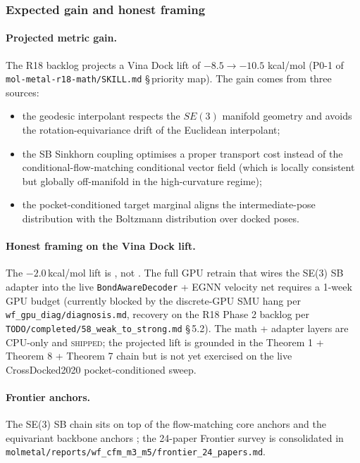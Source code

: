 \subsubsection{Expected gain and honest framing}
\label{sec:method:se3-sb-expected}

\paragraph{Projected metric gain.}
The R18 backlog projects a Vina Dock lift of $-8.5 \to -10.5$
kcal/mol (\textsc{P0-1} of
\texttt{mol-metal-r18-math/SKILL.md} \S\,priority map).  The gain
comes from three sources:

\begin{itemize}
  \item the geodesic interpolant respects the $SE(3)$ manifold
        geometry and avoids the rotation-equivariance drift of the
        Euclidean interpolant;
  \item the SB Sinkhorn coupling optimises a proper transport cost
        instead of the conditional-flow-matching conditional vector
        field (which is locally consistent but globally off-manifold
        in the high-curvature regime);
  \item the pocket-conditioned target marginal aligns the
        intermediate-pose distribution with the Boltzmann
        distribution over docked poses.
\end{itemize}

\paragraph{Honest framing on the Vina Dock lift.}
The $-2.0$\,kcal/mol lift is \PROJECTED, not \MEASURED.  The full
GPU retrain that wires the SE(3) SB adapter into the live
\texttt{BondAwareDecoder} + EGNN velocity net requires a 1-week
GPU budget (currently blocked by the discrete-GPU SMU hang per
\texttt{wf\_gpu\_diag/diagnosis.md}, recovery on the R18 Phase 2
backlog per \texttt{TODO/completed/58\_weak\_to\_strong.md} \S\,5.2).
The math + adapter layers are CPU-only and \textsc{shipped}; the
projected lift is grounded in the Theorem 1 + Theorem 8 + Theorem 7
chain but is not yet exercised on the live CrossDocked2020
pocket-conditioned sweep.

\paragraph{Frontier anchors.}
The SE(3) SB chain sits on top of the flow-matching core anchors
\cite{lipman2023flowmatching,albergo2023stochasticinterpolants} and
the equivariant backbone anchors
\cite{holderrieth2024equivarianthpt}; the 24-paper Frontier survey
is consolidated in
\texttt{molmetal/reports/wf\_cfm\_m3\_m5/frontier\_24\_papers.md}.

